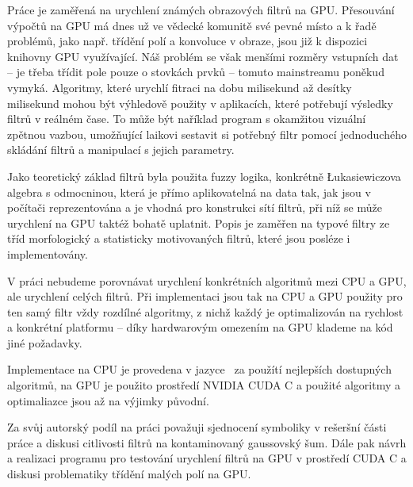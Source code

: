 


Práce je zaměřená na urychlení známých obrazových filtrů na GPU. Přesouvání výpočtů na GPU má dnes už ve vědecké komunitě své pevné místo a k řadě problémů, jako např. třídění polí a konvoluce v obraze, jsou již k dispozici knihovny GPU využívající. Náš problém se však menšími rozměry vstupních dat -- je třeba třídit pole pouze o stovkách prvků -- tomuto mainstreamu poněkud vymyká. Algoritmy, které urychlí fitraci na dobu milisekund až desítky milisekund mohou být výhledově použity v aplikacích, které potřebují výsledky filtrů v reálném čase. To může být naříklad program s okamžitou vizuální zpětnou vazbou, umožňující laikovi sestavit si potřebný filtr pomocí jednoduchého skládání filtrů a manipulací s jejich parametry.

Jako teoretický základ filtrů byla použita fuzzy logika, konkrétně \L ukasiewiczova algebra s odmocninou, která je přímo aplikovatelná na data tak, jak jsou v počítači reprezentována a je vhodná pro konstrukci sítí filtrů, při níž se může urychlení na GPU taktéž bohatě uplatnit.
Popis je zaměřen na typové filtry ze tříd morfologický a statisticky motivovaných filtrů, které jsou posléze i implementovány.

V práci nebudeme porovnávat urychlení konkrétních algoritmů mezi CPU a GPU, ale urychlení celých filtrů. Při implementaci jsou tak na CPU a GPU použity pro ten samý filtr vždy rozdílné algoritmy, z nichž každý je optimalizován na rychlost a konkrétní platformu -- díky hardwarovým omezením na GPU klademe na kód jiné požadavky.

Implementace na CPU je provedena v jazyce \Cpp ~za použítí nejlepších dostupných algoritmů, na GPU je použito prostředí NVIDIA CUDA C a použité algoritmy a optimaliazce jsou až na výjimky původní.

Za svůj autorský podíl na práci považuji sjednocení symboliky v rešeršní části práce a diskusi citlivosti filtrů na kontaminovaný gaussovský šum. Dále pak návrh a realizaci programu pro testování urychlení filtrů na GPU v prostředí CUDA C a diskusi problematiky třídění malých polí na GPU.
